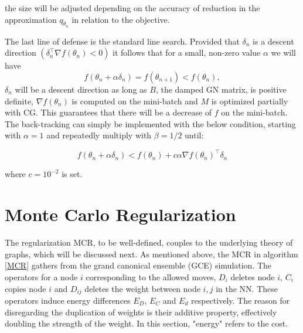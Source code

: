 \noindent
the size will be adjusted depending on the accuracy of reduction in the approximation $q_{\theta_n}$ in relation to the objective. 

The last line of defense is the standard line search. Provided that $\delta_n$ is a descent direction $(\delta_n^\intercal \nabla f(\theta_n) < 0)$ it follows that for a small, non-zero value $\alpha$ we will have \[f(\theta_n + \alpha \delta_n) = f(\theta_{n+1}) < f(\theta_n),\] $\delta_n$ will be a descent direction as long as $B$, the damped GN matrix, is positive definite, $\nabla f(\theta_n)$ is computed on the mini-batch and $M$ is optimized partially with CG\cite{Martens2012}. This guarantees that there will be a decrease of $f$ on the mini-batch. The back-tracking can simply be implemented with the below condition, starting with $\alpha = 1$ and repeatedly multiply with $\beta = 1/2$ until:

\[f(\theta_n + \alpha \delta_n) < f(\theta_n) + c \alpha \nabla f(\theta_n)^\intercal \delta_n\]

where $c = 10^{-2}$ is set.

\section{Monte Carlo Regularization}

The regularization MCR, to be well-defined, couples to the underlying theory of graphs, which will be discussed next. As mentioned above, the MCR in algorithm \ref{MCR} gathers from the grand canonical ensemble (GCE) simulation. The operators for a node $i$ corresponding to the allowed moves, $D_i$ deletes node $i$, $C_i$ copies node $i$ and $D_{ij}$ deletes the weight between node $i,j$ in the NN. These operators induce energy differences $E_D$, $E_C$ and $E_d$ respectively. The reason for disregarding the duplication of weights is their additive property, effectively doubling the strength of the weight. In this section, "energy" refers to the cost.


